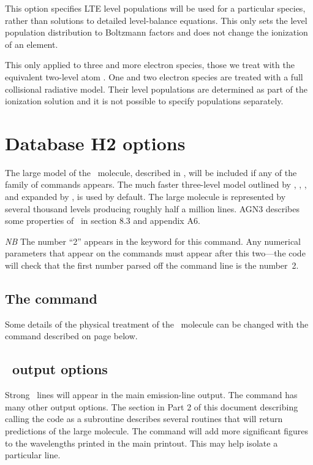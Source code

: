 This option specifies LTE level populations will be used for 
a particular species, rather than solutions to detailed level-balance equations.
This only sets the level population distribution to Boltzmann factors
and does not change the ionization of an element.

This only applied to three and more electron species, those we treat with the
equivalent two-level atom \citep{CloudyRevista2017}.
One and two electron species are treated with a full collisional radiative model.
Their level populations are determined as part of the ionization solution and
it is not possible to specify populations separately.

\section{Database H2 options}
\label{sec:AtomH2}

The large model of the \htwo\ molecule, described in \citet{Shaw2005},
will be included if any of the family of 
commands appears.
The much
faster three-level model outlined by \citet{Tielens1985a},
\citet{Burton1990}, \citet{Draine1996},
and expanded
by \citet{Elwert2006}, is used by default.
The large molecule is
represented by several thousand levels producing roughly half a million
lines.
AGN3 describes some properties of \htwo\ in section 8.3
and appendix A6.

\emph{NB}  The number ``2'' appears in the keyword for this command.
Any
numerical parameters that appear on the 
commands must appear after
this two---the code will check that the first number
parsed off the command line is the number~2.

\subsection{The  command}

Some details of the physical treatment of the \htwo\ molecule can be
changed with the  command described on page
\pageref{sec:SetH2} below.

\subsection{\htwo\ output options}

Strong \htwo\ lines will appear in the main emission-line output.
The  command has many other output options.
The
section in Part 2 of this document describing calling the code as a
subroutine describes several routines that will return predictions of the
large molecule.
The  command
will add more significant figures to the wavelengths printed in the main
printout.
This may help isolate a particular line.

